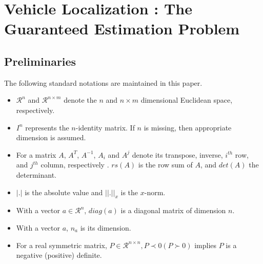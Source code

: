 \chapter{Vehicle Localization : The Guaranteed Estimation Problem} \label{ch:problem}
\section{Preliminaries}
The following standard notations are maintained in this paper.
\begin{itemize}
\item{$\mathcal{R}^n$ and $\mathcal{R}^{n \times m}$ denote the $n$ and $n \times m$ dimensional Euclidean space, respectively.}
\item{$I^n$ represents the $n$-identity matrix. If $n$ is missing, then appropriate dimension is assumed.}
\item{For a matrix $A$, $A^T$, $A^{-1}$, $A_{i}$ and $A^{j}$ denote its transpose, inverse, $i^{th}$ row, and $j^{th}$ column, respectively . $rs(A)$ is the row sum of $A$, and $det(A)$ the determinant.}
\item{$|.|$ is the absolute value and $||.||_{x}$ is the $x$-norm.}
\item{With a vector $a \in \mathcal{R}^n$, $diag(a)$ is a diagonal matrix of dimension $n$.}
\item{With a vector $a$, $n_a$ is its dimension.}
\item{For a real symmetric matrix, $P \in \mathcal{R}^{n \times n}, P \prec 0(P \succ 0)$ implies $P$ is a negative (positive) definite.}
\end{itemize}

